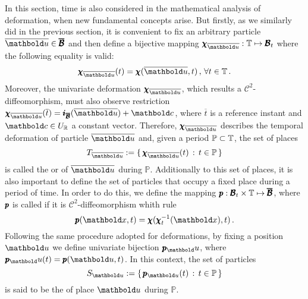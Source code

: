 In this section, time is also considered in the mathematical analysis of deformation, when new fundamental concepts arise. But firstly, as we similarly did in the previous section, it is convenient to fix an arbitrary particle $\overline{\vto{u}}\in\tnr{\overline{\mathcal{B}}}$ and then define a bijective mapping $\map{\tnr{\chi}_{\overline{\vto{u}}}}{\tempo}{\tnr{\mathcal{B}}_t}$ where the following equality is valid:  
\begin{equation}
\fua{\tnr{\chi}_{\overline{\vto{u}}}}{t}=\fua{\tnr{\chi}}{\overline{\vto{u}},t}\,,\,\forall t\in\tempo\,.
\end{equation}
Moreover, the univariate deformation $\tnr{\chi}_{\overline{\vto{u}}}$, which results a $\mathcal{C}^{2}$-diffeomorphism, must also  observe restriction 
$\fua{\tnr{\chi}_{\overline{\vto{u}}}}{\overline{t}}=\tnr{i}_{\tnr{\overline{\mathcal{B}}}}(\overline{\vto{u}})+\vto{c}$, where $\overline{t}$ is a reference instant and $\vto{c}\in U_\real$ a constant vector. Therefore, $\tnr{\chi}_{\overline{\vto{u}}}$ describes the temporal deformation of particle $\overline{\vto{u}}$ and, given a period $\mathbb{P}\subset\mathbb{T}$, the set of places 
\begin{equation}
T_{\overline{\vto{u}}}:=\{\,\fua{\tnr{\chi}_{\overline{\vto{u}}}}{t}\,:\,t\in\mathbb{P}\,\}
\end{equation}
is called the  or  of $\overline{\vto{u}}$ during $\mathbb{P}$. Additionally to this set of places, it is also important to define the set of particles that occupy a fixed place during a period of time. In order to do this, we define the mapping $\pmb{p} : \pmb{\mathcal{B}}_t\times\mathbb{T} \mapsto \pmb{\overline{\mathcal{B}}}$, where $\pmb{p}$ is called  if it is $\mathcal{C}^2$-diffeomorphism whith rule
\begin{equation}
\fua{\tnr{p}}{\vto{x},t}=\tnr{\chi}(\fua{\tnr{\chi}_{t}^{-1}}{\vto{x}},t)\,.
\end{equation}
Following the same procedure adopted for deformations, by fixing a position $\vto{u}$ we define univariate bijection $\tnr{p}_\vto{u}$, where $\fua{\tnr{p}_\vto{u}}{t}=\fua{\tnr{p}}{\vto{u},t}$. In this context, the set of particles
\begin{equation}
S_{\vto{u}}:=\{\,\fua{\tnr{p}_{\vto{u}}}{t}\,:\,t\in\mathbb{P}\,\}
\end{equation}
is said to be the  of place $\vto{u}$ during $\mathbb{P}$. 


